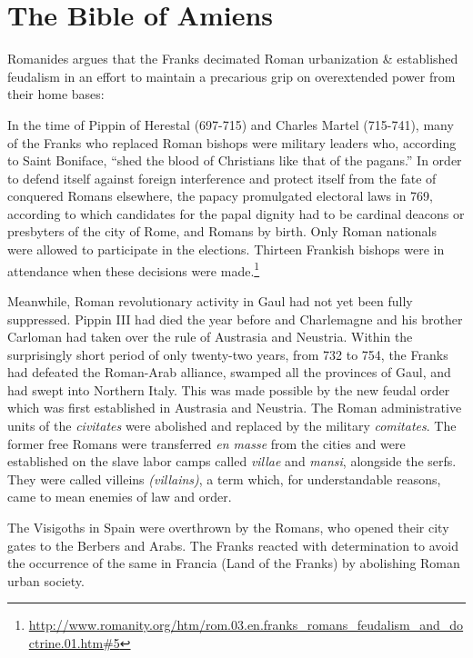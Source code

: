 \section{The Bible of Amiens}

Romanides argues that the Franks decimated Roman urbanization \& established feudalism in an effort to maintain a precarious grip on overextended power from their home bases:

\begin{quotationx}
In the time of Pippin of Herestal (697-715) and Charles Martel (715-741), many of the Franks who replaced Roman bishops were military leaders who, according to Saint Boniface, ``shed the blood of Christians like that of the pagans.'' In order to defend itself against foreign interference and protect itself from the fate of conquered Romans elsewhere, the papacy promulgated electoral laws in 769, according to which candidates for the papal dignity had to be cardinal deacons or presbyters of the city of Rome, and Romans by birth. Only Roman nationals were allowed to participate in the elections. Thirteen Frankish bishops were in attendance when these decisions were made.\footnote{\url{http://www.romanity.org/htm/rom.03.en.franks\_romans\_feudalism\_and\_doctrine.01.htm\#5}}

Meanwhile, Roman revolutionary activity in Gaul had not yet been fully suppressed. Pippin III had died the year before and Charlemagne and his brother Carloman had taken over the rule of Austrasia and Neustria. Within the surprisingly short period of only twenty-two years, from 732 to 754, the Franks had defeated the Roman-Arab alliance, swamped all the provinces of Gaul, and had swept into Northern Italy. This was made possible by the new feudal order which was first established in Austrasia and Neustria. The Roman administrative units of the \emph{civitates} were abolished and replaced by the military \emph{comitates}. The former free Romans were transferred \emph{en masse} from the cities and were established on the slave labor camps called \emph{villae} and \emph{mansi}, alongside the serfs. They were called villeins \emph{(villains)}, a term which, for understandable reasons, came to mean enemies of law and order.

The Visigoths in Spain were overthrown by the Romans, who opened their city gates to the Berbers and Arabs. The Franks reacted with determination to avoid the occurrence of the same in Francia (Land of the Franks) by abolishing Roman urban society.


\end{quotationx}
